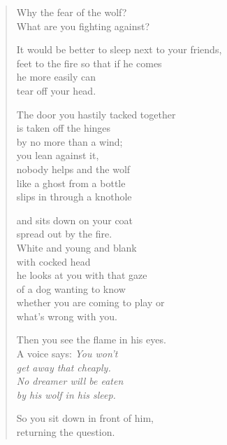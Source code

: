 \begin{verse}

Why the fear of the wolf?\\
What are you fighting against?

It would be better to sleep next to your friends,\\
feet to the fire so that if he comes\\
he more easily can\\
tear off your head.

The door you hastily tacked together\\
is taken off the hinges\\
by no more than a wind;\\
you lean against it,\\
nobody helps and the wolf\\
like a ghost from a bottle\\
slips in through a knothole

and sits down on your coat\\
spread out by the fire.\\
White and young and blank\\
with cocked head\\
he looks at you with that gaze\\
of a dog wanting to know\\
whether you are coming to play or\\
what's wrong with you.

\clearpage

Then you see the flame in his eyes.\\
A voice says: {\itshape You won't\\
get away that cheaply.\\
No dreamer will be eaten\\
by his wolf in his sleep.}

So you sit down in front of him,\\
returning the question.

\end{verse}
